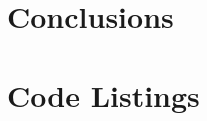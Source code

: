 \documentclass[12pt]{article}
\begin{document}

\section{Conclusions}


\appendix %



\section{Code Listings}\label{code}

%
% 
%



%
%
%
\end{document}
